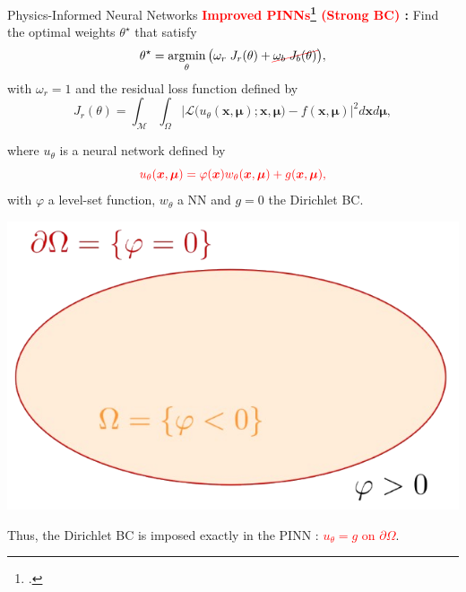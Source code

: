 \begin{frame}[noframenumbering]{Physics-Informed Neural Networks}
	\textbf{\textcolor{red}{Improved PINNs\footcite{LagLikFot1998,FraMicNav2024} (Strong BC)} :} Find the optimal weights $\theta^\star$ that satisfy
	\begin{equation*}
		\theta^\star = \argmin_{\theta}	\big( \omega_r \; J_r(\theta) + \Ccancel[red]{\omega_b \; J_b(\theta)} \big),%
	\end{equation*}
	with $\omega_r=1$ and the residual loss function defined by
	\begin{equation*}
		J_r(\theta) =
		\int_{\mathcal{M}}\int_{\Omega}
		\big| \mathcal{L}\big(u_\theta(\bm{x},\bm{\mu});\bm{x},\bm{\mu}\big)-f(\bm{x},\bm{\mu}) \big|^2 d\bm{x} d\bm{\mu},
	\end{equation*}
	\begin{minipage}{0.75\linewidth}
		where $u_\theta$ is a neural network defined by
		\begin{equation*}
			\textcolor{red}{u_{\theta}(\bm{x},\bm{\mu}) = \varphi(\bm{x}) w_{\theta}(\bm{x},\bm{\mu}) + g(\bm{x},\bm{\mu}),}
		\end{equation*}
		with $\varphi$ a level-set function, $w_\theta$ a NN and $g=0$ the Dirichlet BC. 
	\end{minipage}
	\begin{minipage}{0.23\linewidth}
		\vspace{-15pt}
		\hspace{-23pt}\includegraphics[width=1.3\linewidth]{images/intro/levelset.png}
	\end{minipage}

	\vspace{5pt}
	Thus, the Dirichlet BC is imposed exactly in the PINN : \textcolor{red}{$u_{\theta} = g$ on $\partial \Omega$}.

	\vspace{15pt}
\end{frame}


